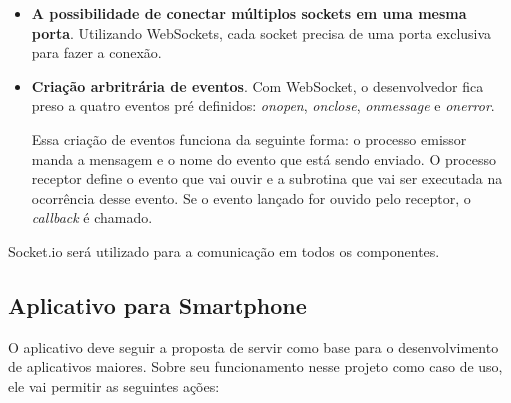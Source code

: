 \documentclass[a4paper,12pt]{article}
\begin{document}
\begin{itemize}

\item \textbf{A possibilidade de conectar múltiplos sockets em uma mesma porta}. Utilizando WebSockets, cada socket precisa de uma porta exclusiva para fazer a conexão.

\item \textbf{Criação arbritrária de eventos}. Com WebSocket, o desenvolvedor fica preso a quatro eventos pré definidos: \emph{onopen}, \emph{onclose}, \emph{onmessage} e \emph{onerror}.

Essa criação de eventos funciona da seguinte forma: o processo emissor manda a mensagem e o nome do evento que está sendo enviado. O processo receptor define o evento que vai ouvir e a subrotina que vai ser executada na ocorrência desse evento. Se o evento lançado for ouvido pelo receptor, o \emph{callback} é chamado.
\end{itemize}

Socket.io será utilizado para a comunicação em todos os componentes.%



\newpage
\subsection{Aplicativo para Smartphone}

O aplicativo deve seguir a proposta de servir como base para o desenvolvimento de aplicativos maiores. Sobre seu funcionamento nesse projeto como caso de uso, ele vai permitir as seguintes ações:
\end{document}

